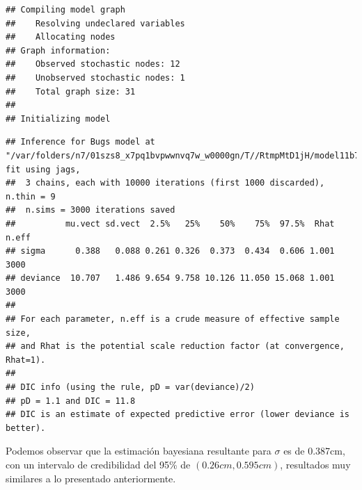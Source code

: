 \begin{Eje}
\begin{knitrout}
\begin{kframe}
\begin{alltt}
 \hlkwb{<-} \hlstd{(}  \hlstd{=}\hlstd{,}
\hlstd{=}\hlstd{,} 
\end{alltt}
\begin{verbatim}
## Compiling model graph
##    Resolving undeclared variables
##    Allocating nodes
## Graph information:
##    Observed stochastic nodes: 12
##    Unobserved stochastic nodes: 1
##    Total graph size: 31
## 
## Initializing model
\end{verbatim}
\begin{alltt}
\end{alltt}
\begin{verbatim}
## Inference for Bugs model at "/var/folders/n7/01szs8_x7pq1bvpwwnvq7w_w0000gn/T//RtmpMtD1jH/model11b75fb4487c.txt", fit using jags,
##  3 chains, each with 10000 iterations (first 1000 discarded), n.thin = 9
##  n.sims = 3000 iterations saved
##          mu.vect sd.vect  2.5%   25%    50%    75%  97.5%  Rhat n.eff
## sigma      0.388   0.088 0.261 0.326  0.373  0.434  0.606 1.001  3000
## deviance  10.707   1.486 9.654 9.758 10.126 11.050 15.068 1.001  3000
## 
## For each parameter, n.eff is a crude measure of effective sample size,
## and Rhat is the potential scale reduction factor (at convergence, Rhat=1).
## 
## DIC info (using the rule, pD = var(deviance)/2)
## pD = 1.1 and DIC = 11.8
## DIC is an estimate of expected predictive error (lower deviance is better).
\end{verbatim}
\end{kframe}
\end{knitrout}
    
    Podemos observar que la estimaci\'on bayesiana resultante para $\sigma$ es de 0.387cm, con un intervalo de credibilidad del 95\% de $(0.26cm,0.595cm)$, resultados muy similares a lo presentado anteriormente. 
\end{Eje}

